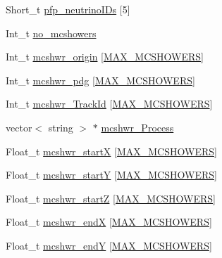 \begin{DoxyCompactItemize}
\item 
Short\-\_\-t \hyperlink{classanatree_acdbc1868566b30e6fc35afd5d9f250b5}{pfp\-\_\-neutrino\-I\-Ds} \mbox{[}5\mbox{]}
\item 
Int\-\_\-t \hyperlink{classanatree_ae77617a039a9df423a3e1ac0c13856df}{no\-\_\-mcshowers}
\item 
Int\-\_\-t \hyperlink{classanatree_a95bccf4ef9080348992fb1d6997a9c80}{mcshwr\-\_\-origin} \mbox{[}\hyperlink{anatree__core__v09410002_8h_ac14fc9ac3bf074dc1c2ab53cbd26449b}{M\-A\-X\-\_\-\-M\-C\-S\-H\-O\-W\-E\-R\-S}\mbox{]}
\item 
Int\-\_\-t \hyperlink{classanatree_a6e1c72b56d2e547dc3296c34d3f4784a}{mcshwr\-\_\-pdg} \mbox{[}\hyperlink{anatree__core__v09410002_8h_ac14fc9ac3bf074dc1c2ab53cbd26449b}{M\-A\-X\-\_\-\-M\-C\-S\-H\-O\-W\-E\-R\-S}\mbox{]}
\item 
Int\-\_\-t \hyperlink{classanatree_a33f6d90f5e7c3ff2e3e3c0b7a5cad3dd}{mcshwr\-\_\-\-Track\-Id} \mbox{[}\hyperlink{anatree__core__v09410002_8h_ac14fc9ac3bf074dc1c2ab53cbd26449b}{M\-A\-X\-\_\-\-M\-C\-S\-H\-O\-W\-E\-R\-S}\mbox{]}
\item 
vector$<$ string $>$ $\ast$ \hyperlink{classanatree_a231d8275738c1e88e811d38922ada74b}{mcshwr\-\_\-\-Process}
\item 
Float\-\_\-t \hyperlink{classanatree_a718bbfa954efe14070fd8daae18726c2}{mcshwr\-\_\-start\-X} \mbox{[}\hyperlink{anatree__core__v09410002_8h_ac14fc9ac3bf074dc1c2ab53cbd26449b}{M\-A\-X\-\_\-\-M\-C\-S\-H\-O\-W\-E\-R\-S}\mbox{]}
\item 
Float\-\_\-t \hyperlink{classanatree_ab9a65cb8aa831e6f725d76b30612a5c9}{mcshwr\-\_\-start\-Y} \mbox{[}\hyperlink{anatree__core__v09410002_8h_ac14fc9ac3bf074dc1c2ab53cbd26449b}{M\-A\-X\-\_\-\-M\-C\-S\-H\-O\-W\-E\-R\-S}\mbox{]}
\item 
Float\-\_\-t \hyperlink{classanatree_af389773f10b120abbb9a3d702ee5a80f}{mcshwr\-\_\-start\-Z} \mbox{[}\hyperlink{anatree__core__v09410002_8h_ac14fc9ac3bf074dc1c2ab53cbd26449b}{M\-A\-X\-\_\-\-M\-C\-S\-H\-O\-W\-E\-R\-S}\mbox{]}
\item 
Float\-\_\-t \hyperlink{classanatree_aa8e170dc735b2d5b64fb108ba71c16de}{mcshwr\-\_\-end\-X} \mbox{[}\hyperlink{anatree__core__v09410002_8h_ac14fc9ac3bf074dc1c2ab53cbd26449b}{M\-A\-X\-\_\-\-M\-C\-S\-H\-O\-W\-E\-R\-S}\mbox{]}
\item 
Float\-\_\-t \hyperlink{classanatree_a1b692643a5d24d4235ed3a0a1c68523e}{mcshwr\-\_\-end\-Y} \mbox{[}\hyperlink{anatree__core__v09410002_8h_ac14fc9ac3bf074dc1c2ab53cbd26449b}{M\-A\-X\-\_\-\-M\-C\-S\-H\-O\-W\-E\-R\-S}\mbox{]}

\end{DoxyCompactItemize}
